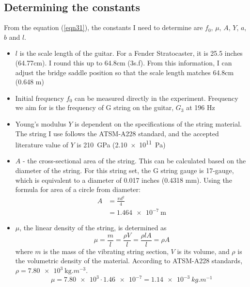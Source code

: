 \documentclass[11pt]{article}
\begin{document}
\begin{flushleft}
        \subsection{Determining the constants}
            From the equation (\ref{eqn31}), the constants I need to determine are $f_0$, $\mu$, $A$, $Y$, $a$, $b$ and $l$. 
            \begin{itemize}
                \item $l$ is the scale length of the guitar. For a Fender Stratocaster, it is 25.5 inches (64.77cm). I round this up to 64.8cm (3s.f). From this information, I can adjust the bridge saddle position so that the scale length matches 64.8cm (0.648 m)
                \item Initial frequency $f_0$ can be measured directly in the experiment. Frequency we aim for is the frequency of G string on the guitar, $G_3$ at 196 Hz
                \item Young's modulus $Y$ is dependent on the specifications of the string material. The string I use follows the ATSM-A228 standard, and the accepted literature value of $Y$ is \SI{210}{\giga\pascal} (\SI{2.10e11}{\pascal})
                \item $A$ - the cross-sectional area of the string. This can be calculated based on the diameter of the string. For this string set, the G string gauge is 17-gauge, which is equivalent to a diameter of 0.017 inches (0.4318 mm). Using the formula for area of a circle from diameter:
                \begin{align*}
                    A &= \frac{\pi d^2}{4} \\
                    &= \SI{1.464e-7}{\meter}
                \end{align*}
                \item $\mu$, the linear density of the string, is determined as \\
                \begin{equation*}
                    \mu = \frac{m}{l} = \frac{\rho V}{l} = \frac{\rho l A}{l} = \rho A
                \end{equation*}
                where $m$ is the mass of the vibrating string section, $V$ is its volume, and $\rho$ is the volumetric density of the material. According to ATSM-A228 standards, $\rho = \SI{7.80e3}{\kg.m^{-3}}$.
                \begin{equation*}
                    \mu = \num{7.80e3} \cdot \num{1.46e-7} = \SI{1.14e-3}{kg.m^{-1}}
                \end{equation*}

\end{itemize}
\end{flushleft}
\end{document}
